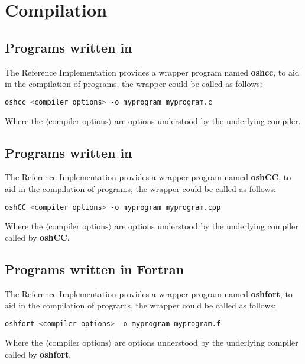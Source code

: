 \section{Compilation}
\subsection*{Programs written in \Cstd}

The \openshmem Reference Implementation provides a wrapper program named
\textbf{oshcc}, to aid in the compilation of \Cstd programs, the wrapper
could be called as follows:

\begin{lstlisting}[language=bash]
oshcc <compiler options> -o myprogram myprogram.c
\end{lstlisting}
Where the $\langle\mbox{compiler options}\rangle$ are options understood by the
underlying \Cstd compiler.


\subsection*{Programs written in \Cpp}

The  \openshmem Reference Implementation provides a wrapper program named
\textbf{oshCC}, to aid in the compilation of \Cpp programs, the wrapper could
be called as follows:

\begin{lstlisting}[language=bash]
oshCC <compiler options> -o myprogram myprogram.cpp
\end{lstlisting}
Where the $\langle\mbox{compiler options}\rangle$ are options understood by the
underlying \Cpp compiler called by \textbf{oshCC}.


\subsection*{Programs written in Fortran}

\begin{deprecate}
The \openshmem Reference Implementation provides a wrapper program named
\textbf{oshfort}, to aid in the compilation of \Fortran programs, the wrapper
could be called as follows:

\begin{lstlisting}[language=bash]
oshfort <compiler options> -o myprogram myprogram.f
\end{lstlisting}
Where the $\langle\mbox{compiler options}\rangle$ are options understood by the
underlying \Fortran compiler called by \textbf{oshfort}.
\end{deprecate}

